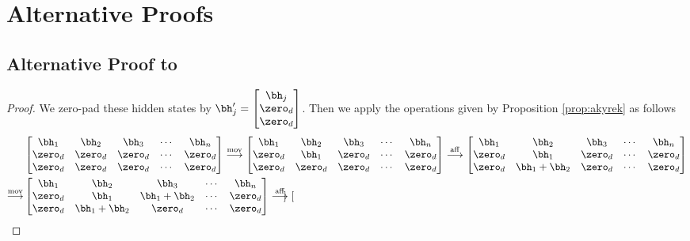 \section{Alternative Proofs}

\subsection{Alternative Proof to }
\begin{proof}
    We zero-pad these hidden states by $\bh_j' = \begin{bmatrix}
        \bh_j \\ \zero_d \\ \zero_d
    \end{bmatrix}$. Then we apply the operations given by Proposition \ref{prop:akyrek} as follows
\begin{equation}
\begin{aligned}
&\begin{bmatrix}
    \bh_1 & \bh_2 & \bh_3 &\cdots & \bh_n \\
    \zero_d & \zero_d & \zero_d & \cdots & \zero_d \\
    \zero_d & \zero_d & \zero_d & \cdots & \zero_d 
\end{bmatrix} \overset{\mathrm{mov}}{\longrightarrow} \begin{bmatrix}
    \bh_1 & \bh_2 & \bh_3 &\cdots & \bh_n \\
    \zero_d & \bh_1 & \zero_d & \cdots & \zero_d \\
    \zero_d & \zero_d & \zero_d & \cdots & \zero_d 
\end{bmatrix} \overset{\mathrm{aff}}{\longrightarrow} \begin{bmatrix}
    \bh_1 & \bh_2 & \bh_3 &\cdots & \bh_n \\
    \zero_d & \bh_1 & \zero_d & \cdots & \zero_d \\
    \zero_d & \bh_1 + \bh_2 & \zero_d & \cdots & \zero_d  
\end{bmatrix} \\
\overset{\mathrm{mov}}{\longrightarrow} &\begin{bmatrix}
    \bh_1 & \bh_2 & \bh_3 &\cdots & \bh_n \\
    \zero_d & \bh_1 & \bh_1 + \bh_2 & \cdots & \zero_d \\
    \zero_d & \bh_1 + \bh_2 & \zero_d & \cdots & \zero_d  
\end{bmatrix} \overset{\mathrm{aff}}{\longrightarrow}
\begin{bmatrix}

\end{bmatrix}
\end{aligned}
\end{equation}
\end{proof}
